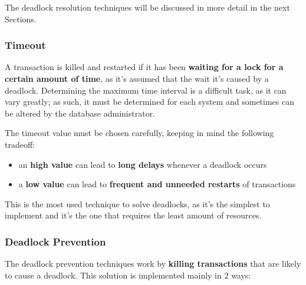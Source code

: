 \documentclass[english]{article}
\begin{document}
The deadlock resolution techniques will be discussed in more detail in the next Sections.

\subsubsection{Timeout}

A transaction is killed and restarted if it has been \textbf{waiting for a lock for a certain amount of time}, as it's assumed that the wait it's caused by a deadlock.
Determining the maximum time interval is a difficult task, as it can vary greatly;
as such, it must be determined for each system and sometimes can be altered by the database administrator.

The timeout value must be chosen carefully, keeping in mind the following tradeoff:

\begin{itemize}
  \item an \textbf{high value} can lead to \textbf{long delays} whenever a deadlock occurs
  \item a \textbf{low value} can lead to \textbf{frequent and unneeded restarts} of transactions
\end{itemize}

This is the most used technique to solve deadlocks, as it's the simplest to implement and it's the one that requires the least amount of resources.

\subsubsection{Deadlock Prevention}

The deadlock prevention techniques work by \textbf{killing transactions} that are likely to cause a deadlock.
This solution is implemented mainly in \(2\) ways:
\end{document}
